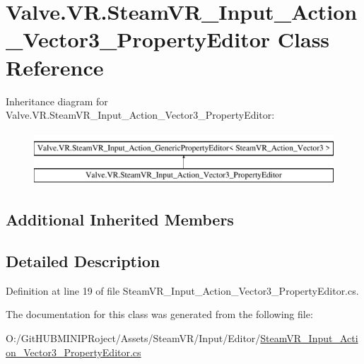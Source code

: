 \hypertarget{class_valve_1_1_v_r_1_1_steam_v_r___input___action___vector3___property_editor}{}\section{Valve.\+V\+R.\+Steam\+V\+R\+\_\+\+Input\+\_\+\+Action\+\_\+\+Vector3\+\_\+\+Property\+Editor Class Reference}
\label{class_valve_1_1_v_r_1_1_steam_v_r___input___action___vector3___property_editor}
Inheritance diagram for Valve.\+V\+R.\+Steam\+V\+R\+\_\+\+Input\+\_\+\+Action\+\_\+\+Vector3\+\_\+\+Property\+Editor\+:\begin{figure}[H]
\begin{center}
\leavevmode
\includegraphics[height=2.000000cm]{class_valve_1_1_v_r_1_1_steam_v_r___input___action___vector3___property_editor}
\end{center}
\end{figure}
\subsection*{Additional Inherited Members}


\subsection{Detailed Description}


Definition at line 19 of file Steam\+V\+R\+\_\+\+Input\+\_\+\+Action\+\_\+\+Vector3\+\_\+\+Property\+Editor.\+cs.



The documentation for this class was generated from the following file\+:\begin{DoxyCompactItemize}
\item 
O\+:/\+Git\+H\+U\+B\+M\+I\+N\+I\+P\+Roject/\+Assets/\+Steam\+V\+R/\+Input/\+Editor/\mbox{\hyperlink{_steam_v_r___input___action___vector3___property_editor_8cs}{Steam\+V\+R\+\_\+\+Input\+\_\+\+Action\+\_\+\+Vector3\+\_\+\+Property\+Editor.\+cs}}\end{DoxyCompactItemize}
